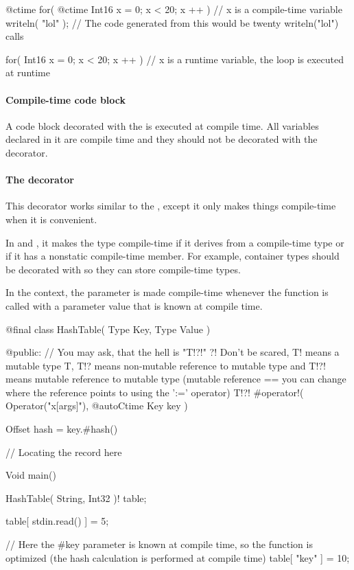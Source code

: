 \begin{code}
@ctime for( @ctime Int16 x = 0; x < 20; x ++ ) {
	// x is a compile-time variable
	writeln( "lol" );
	// The code generated from this would be twenty writeln("lol") calls
}

for( Int16 x = 0; x < 20; x ++ ) {
	// x is a runtime variable, the loop is executed at runtime	
}
\end{code}

\paragraph{Compile-time code block} A code block decorated with the  is executed at compile time. All variables declared in it are compile time and they should not be decorated with the  decorator.

\paragraph{The  decorator} \label{decorator:autoCtime} This decorator works similar to the , except it only makes things compile-time when it is convenient.

In  and , it makes the type compile-time if it derives from a compile-time type or if it has a nonstatic compile-time member. For example, container types should be decorated with  so they can store compile-time types.

In the  context, the parameter is made compile-time whenever the function is called with a parameter value that is known at compile time.
\begin{code}
@final class HashTable( Type Key, Type Value ) {

@public:
	// You may ask, that the hell is "T!?!" ?! Don't be scared, T! means a mutable type T, T!? means non-mutable reference to mutable type and T!?! means mutable reference to mutable type (mutable reference == you can change where the reference points to using the ':=' operator)
	T!?! #operator!( Operator("x[args]"), @autoCtime Key key ) {
		Offset hash = key.#hash() %
		
		// Locating the record here 
	}
	
}

Void main() {
	HashTable( String, Int32 )! table;
	
	table[ stdin.read() ] = 5;
	
	// Here the #key parameter is known at compile time, so the function is optimized (the hash calculation is performed at compile time)
	table[ "key" ] = 10;
}
\end{code}

